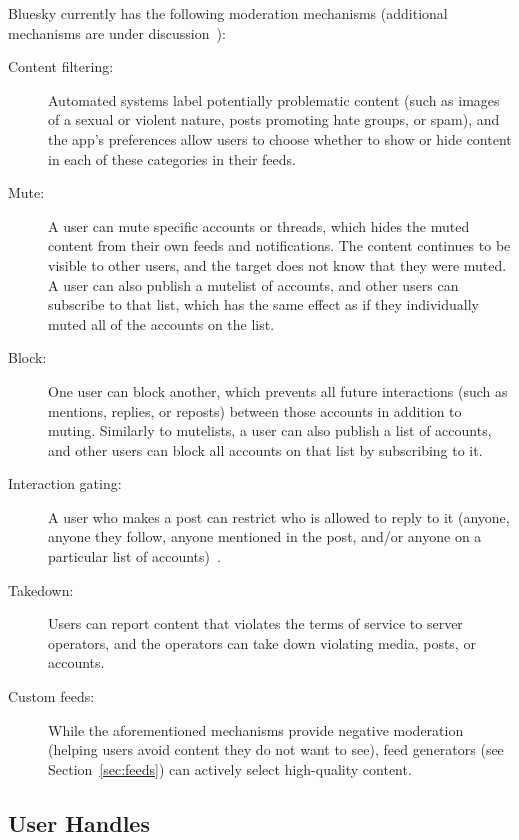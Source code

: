 \documentclass[sigconf,nonacm]{acmart}
\begin{document}
Bluesky currently has the following moderation mechanisms (additional mechanisms are under discussion~\cite{Moderation}):
\begin{description}
    \item[Content filtering:] Automated systems label potentially problematic content (such as images of a sexual or violent nature, posts promoting hate groups, or spam), and the app's preferences allow users to choose whether to show or hide content in each of these categories in their feeds.
    \item[Mute:] A user can mute specific accounts or threads, which hides the muted content from their own feeds and notifications. The content continues to be visible to other users, and the target does not know that they were muted. A user can also publish a mutelist of accounts, and other users can subscribe to that list, which has the same effect as if they individually muted all of the accounts on the list.
    \item[Block:] One user can block another, which prevents all future interactions (such as mentions, replies, or reposts) between those accounts in addition to muting. Similarly to mutelists, a user can also publish a list of accounts, and other users can block all accounts on that list by subscribing to it.
    \item[Interaction gating:] A user who makes a post can restrict who is allowed to reply to it (anyone, anyone they follow, anyone mentioned in the post, and/or anyone on a particular list of accounts)~\cite{ReplyGating}.
    \item[Takedown:] Users can report content that violates the terms of service to server operators, and the operators can take down violating media, posts, or accounts.
    \item[Custom feeds:] While the aforementioned mechanisms provide negative moderation (helping users avoid content they do not want to see), feed generators (see Section~\ref{sec:feeds}) can actively select high-quality content.
\end{description}


\subsection{User Handles}\label{sec:handles}
\end{document}
